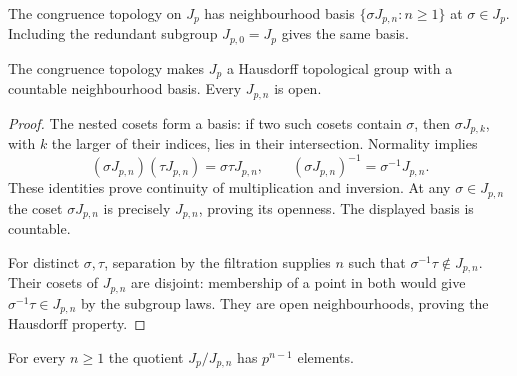 \begin{definition}
\label{def:nottingham-congruence}
\leanok
The congruence topology on $J_p$ has neighbourhood basis
$\{\sigma J_{p,n}:n\ge1\}$ at $\sigma\in J_p$.
Including the redundant subgroup $J_{p,0}=J_p$ gives the same basis.
\end{definition}

\begin{lemma}
\label{lem:nottingham-hausdorff-group}
\leanok
The congruence topology makes $J_p$ a Hausdorff topological group
with a countable neighbourhood basis. Every $J_{p,n}$ is open.
\end{lemma}

\begin{proof}
The nested cosets form a basis: if two such cosets contain $\sigma$,
then $\sigma J_{p,k}$, with $k$ the larger of their indices,
lies in their intersection. Normality implies
\[
 (\sigma J_{p,n})(\tau J_{p,n})=\sigma\tau J_{p,n},
 \qquad (\sigma J_{p,n})^{-1}=\sigma^{-1}J_{p,n}.
\]
These identities prove continuity of multiplication and inversion.
At any $\sigma\in J_{p,n}$ the coset $\sigma J_{p,n}$ is precisely
$J_{p,n}$, proving its openness. The displayed basis is countable.

For distinct $\sigma,\tau$, separation by the filtration supplies
$n$ such that $\sigma^{-1}\tau\notin J_{p,n}$.
Their cosets of $J_{p,n}$ are disjoint: membership of a point in both
would give $\sigma^{-1}\tau\in J_{p,n}$ by the subgroup laws.
They are open neighbourhoods, proving the Hausdorff property.
\end{proof}

\begin{lemma}
\label{lem:nottingham-quotient-card}
\leanok
For every $n\ge1$ the quotient $J_p/J_{p,n}$ has $p^{n-1}$ elements.
\end{lemma}

